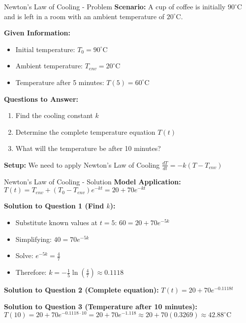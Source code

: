 \documentclass[10pt,aspectratio=169]{beamer}
\begin{document}
\begin{frame}{Newton's Law of Cooling - Problem}
    \textbf{Scenario:} A cup of coffee is initially $90^{\circ}\text{C}$ and is left in a room with an ambient temperature of $20^{\circ}\text{C}$.
    
    \textbf{Given Information:}
    \begin{itemize}
        \item Initial temperature: $T_0 = 90^{\circ}\text{C}$
        \item Ambient temperature: $T_{env} = 20^{\circ}\text{C}$
        \item Temperature after 5 minutes: $T(5) = 60^{\circ}\text{C}$
    \end{itemize}
    
    \textbf{Questions to Answer:}
    \begin{enumerate}
        \item Find the cooling constant $k$
        \item Determine the complete temperature equation $T(t)$
        \item What will the temperature be after 10 minutes?
    \end{enumerate}
    
    \textbf{Setup:} We need to apply Newton's Law of Cooling $\frac{dT}{dt} = -k(T - T_{env})$
\end{frame}

\begin{frame}{Newton's Law of Cooling - Solution}
    \textbf{Model Application:} $T(t) = T_{env} + (T_0 - T_{env})e^{-kt} = 20 + 70e^{-kt}$
    
    \textbf{Solution to Question 1 (Find $k$):}
    \begin{itemize}
        \item Substitute known values at $t=5$: $60 = 20 + 70e^{-5k}$
        \item Simplifying: $40 = 70e^{-5k}$
        \item Solve: $e^{-5k} = \frac{4}{7}$
        \item Therefore: $k = -\frac{1}{5}\ln\left(\frac{4}{7}\right) \approx 0.1118$
    \end{itemize}
    
    \textbf{Solution to Question 2 (Complete equation):}
    $T(t) = 20 + 70e^{-0.1118t}$
    
    \textbf{Solution to Question 3 (Temperature after 10 minutes):}
    $T(10) = 20 + 70e^{-0.1118 \cdot 10} = 20 + 70e^{-1.118} \approx 20 + 70(0.3269) \approx 42.88^{\circ}\text{C}$
\end{frame}
\end{document}
